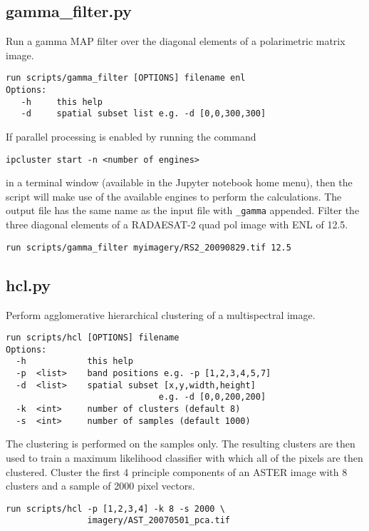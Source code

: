 \documentclass{paper}
\begin{document}
\subsection*{gamma\_filter.py}


Run a gamma MAP filter over the diagonal elements
of a polarimetric matrix image.
\begin{verbatim}
run scripts/gamma_filter [OPTIONS] filename enl
Options:
   -h     this help
   -d     spatial subset list e.g. -d [0,0,300,300]
\end{verbatim}
If parallel processing is enabled by running the command
\begin{lstlisting}
ipcluster start -n <number of engines>
\end{lstlisting}
in a terminal window (available in the Jupyter notebook home menu), then the script will make use of the available engines to perform the calculations. The output file has the same name as the input file with {\tt \_gamma} appended.
\vskip 0.2cm
 Filter the three diagonal elements of a RADAESAT-2 quad pol image with ENL of 12.5.
\begin{lstlisting}
run scripts/gamma_filter myimagery/RS2_20090829.tif 12.5
\end{lstlisting}







\subsection*{hcl.py}
Perform agglomerative hierarchical clustering of a multispectral image.
\begin{verbatim}
run scripts/hcl [OPTIONS] filename
Options:
  -h            this help
  -p  <list>    band positions e.g. -p [1,2,3,4,5,7]
  -d  <list>    spatial subset [x,y,width,height]
                              e.g. -d [0,0,200,200]
  -k  <int>     number of clusters (default 8)
  -s  <int>     number of samples (default 1000)
\end{verbatim}
The clustering is performed on the samples only. The resulting clusters are then used to train a maximum likelihood classifier with which all of the pixels are then clustered.
\vskip 0.2cm
 Cluster the first 4 principle components of an ASTER image with 8 clusters and a sample of 2000 pixel vectors.
\begin{lstlisting}
run scripts/hcl -p [1,2,3,4] -k 8 -s 2000 \
                imagery/AST_20070501_pca.tif
\end{lstlisting}
\end{document}
